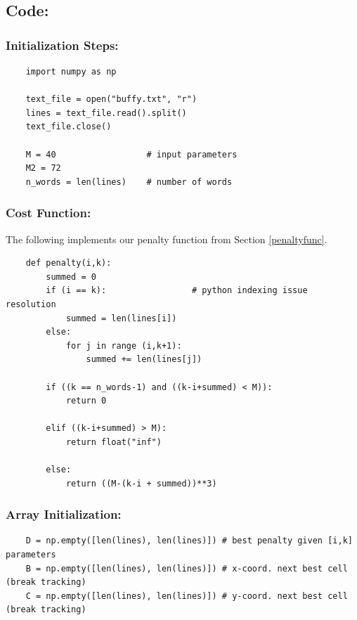 \documentclass[conference]{styles/acmsiggraph}
\newcommand{\?}{\stackrel{?}{=}}
\begin{document}
\subsection{Code:}
\subsubsection*{Initialization Steps:}
\begin{verbatim}
    import numpy as np
    
    text_file = open("buffy.txt", "r")
    lines = text_file.read().split()
    text_file.close()
    
    M = 40                  # input parameters
    M2 = 72
    n_words = len(lines)    # number of words
\end{verbatim}

\subsubsection*{Cost Function:}
The following implements our penalty function from Section \ref{penaltyfunc}.
\begin{verbatim}
    def penalty(i,k):
        summed = 0
        if (i == k):                 # python indexing issue resolution
            summed = len(lines[i])
        else:
            for j in range (i,k+1):
                summed += len(lines[j])
          
        if ((k == n_words-1) and ((k-i+summed) < M)):
            return 0
            
        elif ((k-i+summed) > M):
            return float("inf")
        
        else:
            return ((M-(k-i + summed))**3)
\end{verbatim}

\subsubsection*{Array Initialization:}
\begin{verbatim}
    D = np.empty([len(lines), len(lines)]) # best penalty given [i,k] parameters
    B = np.empty([len(lines), len(lines)]) # x-coord. next best cell (break tracking)
    C = np.empty([len(lines), len(lines)]) # y-coord. next best cell (break tracking)
\end{verbatim}

    
\end{document}
